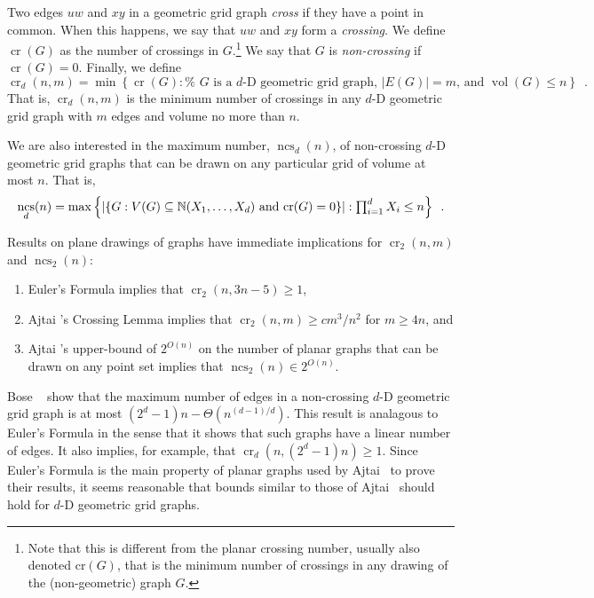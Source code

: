 \documentclass{patmorin}
\DeclareMathOperator{\crs}{cr}
\DeclareMathOperator{\ncs}{ncs}
\DeclareMathOperator{\volume}{vol}
\begin{document}
Two edges $uw$ and $xy$ in a geometric grid graph \emph{cross} if they have a
point in common.  When this happens, we say that $uw$ and $xy$ form
a \emph{crossing}.  We define $\crs(G)$ as the number of crossings
in $G$.\footnote{Note that this is different from the planar crossing
number, usually also denoted $\mathrm{cr}(G)$, that is the minimum number of
crossings in any drawing of the (non-geometric) graph $G$.}  We say that
$G$ is \emph{non-crossing} if $\crs(G)=0$.  Finally, we define
\[ \crs_d(n,m)=\min\left\{\crs(G):\mbox{%
    $G$ is a $d$-D geometric grid graph, $|E(G)|=m$, and $\volume(G)\le n$}
   \right\} \enspace .
\]
That is, $\crs_d(n,m)$ is the minimum number of crossings in any
$d$-D geometric grid graph with $m$ edges and volume no more
than $n$.

We are also interested in the maximum number, $\ncs_d(n)$, of non-crossing
$d$-D geometric grid graphs that can be drawn on any particular grid of
volume at most $n$.  That is,
\[
  \ncs_d(n) = \max\left\{
     \left|\left\{G:\mbox{$V(G)\subseteq\N(X_1,\ldots,X_d)$
            and $\crs(G)=0$} \right\}\right| :
    \mbox{$\prod_{i=1}^d X_i \le n$} \right\} \enspace .
\]

Results on plane drawings of graphs have immediate implications
for $\crs_2(n,m)$ and $\ncs_2(n)$:
\begin{enumerate}
  \item  Euler's Formula implies that $\crs_2(n,3n-5)\ge 1$,
  \item  Ajtai \etal's Crossing Lemma implies that $\crs_2(n,m)\ge
  cm^3/n^2$ for $m\ge 4n$, and
  \item  Ajtai \etal's upper-bound of $2^{O(n)}$ on the number of planar
  graphs that can be drawn on any point set implies that $\ncs_2(n)\in
  2^{O(n)}$.
\end{enumerate}

Bose \etal~\cite{bose.czyzowicz.ea:maximum} show that the maximum
number of edges in a non-crossing $d$-D geometric grid graph is at most
$(2^d-1)n-\Theta(n^{(d-1)/d})$. This result is analagous to Euler's
Formula in the sense that it shows that such graphs have a linear number
of edges.  It also implies, for example, that $\crs_d(n,(2^d-1)n)\ge 1$.
Since Euler's Formula is the main property of planar graphs used by Ajtai
\etal\ to prove their results, it seems reasonable that bounds similar
to those of Ajtai \etal\ should hold for $d$-D geometric grid graphs.
\end{document}
